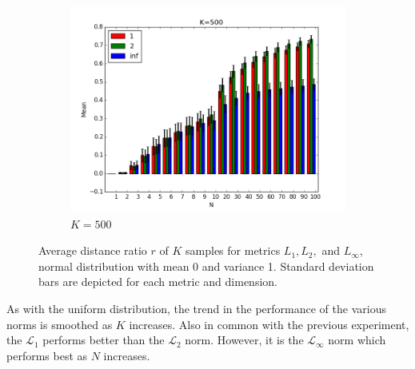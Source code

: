 \documentclass{article}
\begin{document}
\begin{figure}[H]
\centering
   \ContinuedFloat 
    \begin{subfigure}[h]{.8\textwidth}
        \includegraphics[width=\textwidth]{l-experiment2-500-inf.png}
        \caption{$K=500$}
        \label{fig:exp2k500}
    \end{subfigure}
    \caption{Average distance ratio $r$ of $K$ samples for metrics $L_1,L_2,$ and $L_{\infty}$, normal distribution with mean 0 and variance 1. Standard deviation bars are depicted for each metric and dimension.}\label{fig:exp2}
\end{figure}
As with the uniform distribution, the trend in the performance of the various norms is smoothed as $K$ increases. Also in common with the previous experiment, the $\mathcal{L}_1$ performs better than the $\mathcal{L}_2$ norm. However, it is the $\mathcal{L}_{\infty}$ norm which performs best as $N$ increases.
\
\end{document}
